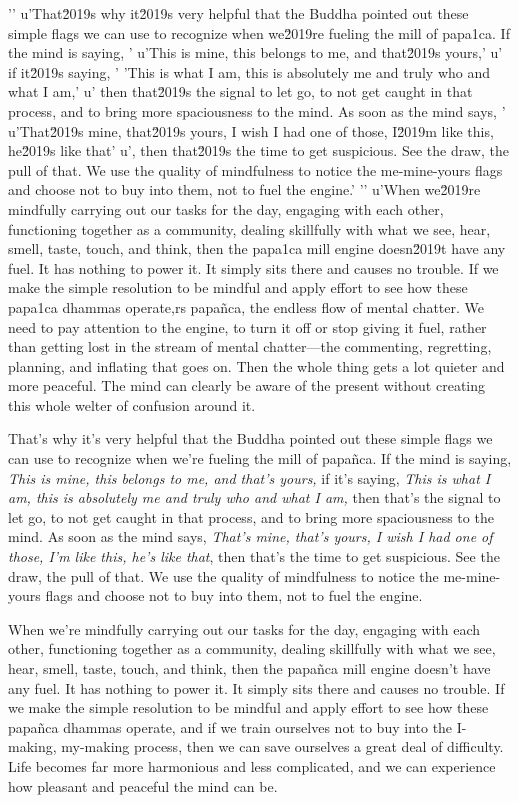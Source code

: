 '\n'
u'That\u2019s why it\u2019s very helpful that the Buddha pointed out these simple flags we can use to recognize when we\u2019re fueling the mill of papa\xf1ca. If the mind is saying, '
u'This is mine, this belongs to me, and that\u2019s yours,'
u' if it\u2019s saying, '
'This is what I am, this is absolutely me and truly who and what I am,'
u' then that\u2019s the signal to let go, to not get caught in that process, and to bring more spaciousness to the mind. As soon as the mind says, '
u'That\u2019s mine, that\u2019s yours, I wish I had one of those, I\u2019m like this, he\u2019s like that'
u', then that\u2019s the time to get suspicious. See the draw, the pull of that. We use the quality of mindfulness to notice the me-mine-yours flags and choose not to buy into them, not to fuel the engine.'
'\n'
u'When we\u2019re mindfully carrying out our tasks for the day, engaging with each other, functioning together as a community, dealing skillfully with what we see, hear, smell, taste, touch, and think, then the papa\xf1ca mill engine doesn\u2019t have any fuel. It has nothing to power it. It simply sits there and causes no trouble. If we make the simple resolution to be mindful and apply effort to see how these papa\xf1ca dhammas operate,rs papañca, the endless flow of mental chatter. We need 
to pay attention to the engine, to turn it off or stop giving it fuel, 
rather than getting lost in the stream of mental chatter---the 
commenting, regretting, planning, and inflating that goes on. Then the 
whole thing gets a lot quieter and more peaceful. The mind can clearly 
be aware of the present without creating this whole welter of confusion 
around it.

That's why it's very helpful that the Buddha pointed out these simple 
flags we can use to recognize when we're fueling the mill of papañca. 
If the mind is saying, \emph{This is mine, this belongs to me, and 
that's yours,} if it's saying, \emph{This is what I am, this is 
absolutely me and truly who and what I am,} then that's the signal to 
let go, to not get caught in that process, and to bring more 
spaciousness to the mind. As soon as the mind says, \emph{That's mine, 
that's yours, I wish I had one of those, I'm like this, he's like 
that}, then that's the time to get suspicious. See the draw, the pull 
of that. We use the quality of mindfulness to notice the me-mine-yours 
flags and choose not to buy into them, not to fuel the engine.

When we're mindfully carrying out our tasks for the day, engaging with 
each other, functioning together as a community, dealing skillfully 
with what we see, hear, smell, taste, touch, and think, then the 
papañca mill engine doesn't have any fuel. It has nothing to power it. 
It simply sits there and causes no trouble. If we make the simple 
resolution to be mindful and apply effort to see how these papañca 
dhammas operate, and if we train ourselves not to buy into the 
I-making, my-making process, then we can save ourselves a great deal of 
difficulty. Life becomes far more harmonious and less complicated, and 
we can experience how pleasant and peaceful the mind can be.

